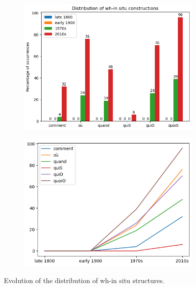 \documentclass[fleqn,10pt]{wlscirep}
\begin{document}
  \begin{figure}[h!]
      \centering
      \begin{subfigure}[b]{0.49\linewidth}
        \includegraphics[width=\linewidth]{images/insitu.png}
      \end{subfigure}
      \begin{subfigure}[b]{0.49\linewidth}
        \includegraphics[width=\linewidth]{images/insitu2.png}
      \end{subfigure}
      \caption{Evolution of the distribution of wh-in situ structures.}
      \label{fig:in situ}
    \end{figure}
\end{document}
